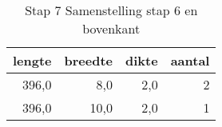 \begin{table}[h!]
\centering
\caption{Stap 7 Samenstelling stap 6 en bovenkant}
\begin{tabular}{rrrr}
\toprule
 lengte &  breedte &  dikte &  aantal \\
\midrule
  396,0 &      8,0 &    2,0 &       2 \\
  396,0 &     10,0 &    2,0 &       1 \\
\bottomrule
\end{tabular}
\end{table}

